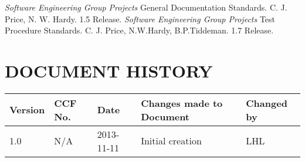 \documentclass{project}
\begin{document}
\clearpage
{}
\begin{thebibliography}{5}
 \emph{Software Engineering Group Projects}
General Documentation Standards.
C. J. Price, N. W. Hardy. 1.5 Release.
 \emph{Software Engineering Group Projects}
Test Procedure Standards.
C. J. Price, N.W.Hardy, B.P.Tiddeman. 1.7 Release.

\end{thebibliography}

\section*{DOCUMENT HISTORY}
\begin{flushleft}
\begin{tabular}{ | p{1.5cm} | p{1cm} | p{2cm} | p{6cm}| p{1.5cm}| }
\hline
Version & CCF No. & Date & Changes made to Document & Changed by \\
\hline
1.0 & N/A & 2013-11-11 & Initial creation & LHL \\
\hline
\end{tabular}
\end{flushleft}
\label{thelastpage}
\end{document}
